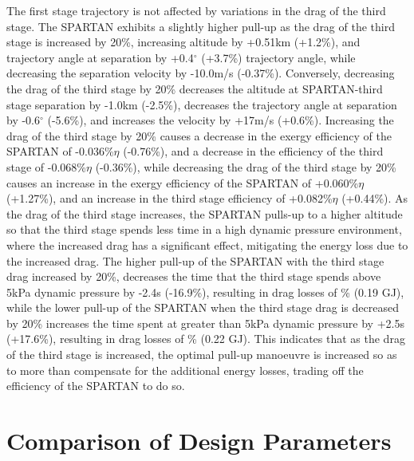 The first stage trajectory is not affected by variations in the drag of the third stage. 
The SPARTAN exhibits a slightly higher pull-up as the drag of the third stage is increased by 20\%, increasing altitude by +0.51km (+1.2\%), and trajectory angle at separation by +0.4$^\circ$ (+3.7\%) trajectory angle, while decreasing the separation velocity by -10.0m/s (-0.37\%). Conversely, decreasing the drag of the third stage by 20\% decreases the altitude at SPARTAN-third stage separation by -1.0km (-2.5\%), decreases the trajectory angle at separation by -0.6$^\circ$ (-5.6\%), and increases the velocity by +17m/s (+0.6\%). 
Increasing the drag of the third stage by 20\% causes a decrease in the exergy efficiency of the SPARTAN of -0.036\%$\eta$ (-0.76\%), and a decrease in the efficiency of the third stage of -0.068\%$\eta$ (-0.36\%), while decreasing the drag of the third stage by 20\% causes an increase in the exergy efficiency of the SPARTAN of +0.060\%$\eta$ (+1.27\%), and an increase in the third stage efficiency of +0.082\%$\eta$ (+0.44\%). 
As the drag of the third stage increases, the SPARTAN pulls-up to a higher altitude so that the third stage spends less time in a high dynamic pressure environment, where the increased drag has a significant effect, mitigating the energy loss due to the increased drag. The higher pull-up of the SPARTAN with the third stage drag increased by 20\%, decreases the time that the third stage spends above 5kPa dynamic pressure by -2.4s (-16.9\%), resulting in drag losses of \WDthreeCdThreeOneHundredTwentyNoReturn\% (0.19 GJ), while the lower pull-up of the SPARTAN when the third stage drag is decreased by 20\% increases the time spent at greater than 5kPa dynamic pressure by +2.5s (+17.6\%), resulting in drag losses of \WDthreeCdThreeEightyNoReturn\% (0.22 GJ). This indicates that as the drag of the third stage is increased, the optimal pull-up manoeuvre is increased so as to more than compensate for the additional energy losses, trading off the efficiency of the SPARTAN to do so. 



\section{Comparison of Design Parameters}\label{sec:comparisonNoReturn}

